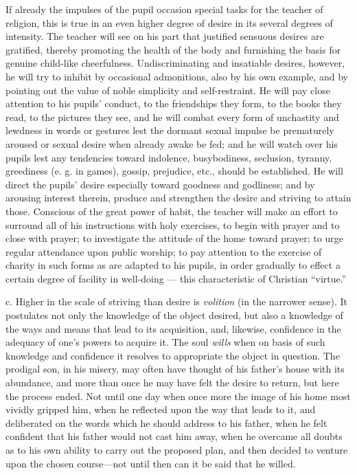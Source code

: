 If already the impulses of the pupil occasion special tasks for the teacher of religion, this is true in an even higher degree of desire in its several degrees of intensity. The teacher will see on his part that justified sensuous desires are gratified, thereby promoting the health of the body and furnishing the basis for genuine child-like cheerfulness. Undiscriminating and insatiable desires, however, he will try to inhibit by occasional admonitions, also by his own example, and by pointing out the value of noble simplicity and self-restraint. He will pay close attention to his pupils’ conduct, to the friendships they form, to the books they read, to the pictures they see, and he will combat every form of unchastity and lewdness in words or gestures lest the dormant sexual impulse be prematurely aroused or sexual desire when already awake be fed; and he will watch over his pupils lest any tendencies toward indolence, busybodiness, seclusion, tyranny, greediness (e. g. in games), gossip, prejudice, etc., should be established. He will direct the pupils’ desire especially toward goodness and godliness; and by arousing interest therein, produce and strengthen the desire and striving to attain those. Conscious of the great power of habit, the teacher will make an effort to surround all of his instructions with holy exercises, to begin with prayer and to close with prayer; to investigate the attitude of the home toward prayer; to urge regular attendance upon public worship; to pay attention to the exercise of charity in such forms as are adapted to his pupils, in order gradually to effect a certain degree of facility in well-doing — this characteristic of Christian “virtue.”

c. Higher in the scale of striving than desire is \emph{volition} (in the narrower sense). It postulates not only the knowledge
of the object desired, but also a knowledge of the ways and means that lead to its acquisition, and, likewise, confidence in the adequacy of one’s powers to acquire it. The soul \emph{wills} when on basis of such knowledge and confidence it resolves to appropriate the object in question. The prodigal son, in his misery, may often have thought of his father’s house with its abundance, and more than once he may have felt the desire to return, but here the process ended. Not until one day when once more the image of his home most vividly gripped him, when he reflected upon the way that leads to it, and deliberated on the words which he should address to his father, when he felt confident that his father would not cast him away, when he overcame all doubts as to his own ability to carry out the proposed plan, and then decided to venture upon the chosen course—not until then can it be said that he willed.

